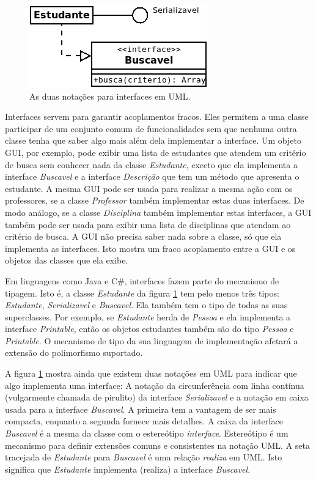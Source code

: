 \begin{figure}[h]
\begin{center}
\includegraphics[scale=0.7]{ifcUml.png}
\end{center}
\caption{As duas notações para interfaces em UML.} \label{fig:ifcUml}
\end{figure}

Interfaces servem para garantir acoplamentos fracos. Eles permitem a uma classe participar de um conjunto comum de funcionalidades sem que nenhuma outra classe tenha que saber algo mais além dela implementar a interface. Um objeto GUI, por exemplo, pode exibir uma lista de estudantes que atendem um critério de busca sem conhecer nada da classe \emph{Estudante}, exceto que ela implementa a interface \emph{Buscavel} e a interface \emph{Descrição} que tem um método que apresenta o estudante. A mesma GUI pode ser usada para realizar a mesma ação com os professores, se a classe \emph{Professor} também implementar estas duas interfaces. De modo análogo, se a classe \emph{Disciplina} também implementar estas interfaces, a GUI também pode ser usada para exibir uma lista de disciplinas que atendam ao critério de busca. A GUI não precisa saber nada sobre a classe, só que ela implementa as interfaces. Isto mostra um fraco acoplamento entre a GUI e os objetos das classes que ela exibe.

Em linguagens como Java e C\#, interfaces fazem parte do mecanismo de tipagem. Isto é, a classe \emph{Estudante} da figura \ref{fig:ifcUml} tem pelo menos três tipos: \emph{Estudante}, \emph{Serializavel} e \emph{Buscavel}. Ela também tem o tipo de todas as suas superclasses. Por exemplo, se \emph{Estudante} herda de \emph{Pessoa} e ela implementa a interface \emph{Printable}, então os objetos estudantes também são do tipo \emph{Pessoa} e \emph{Printable}. O mecanismo de tipo da sua linguagem de implementação afetará a extensão do polimorfismo suportado.

A figura \ref{fig:ifcUml} mostra ainda que existem duas notações em UML para indicar que algo implementa uma interface: A notação da circunferência com linha contínua (vulgarmente chamada de pirulito) da interface \emph{Serializavel} e a notação em caixa usada para a interface \emph{Buscavel}. A primeira tem a vantagem de ser mais compacta, enquanto a segunda fornece mais detalhes. A caixa da interface \emph{Buscavel} é a mesma da classe com o estereótipo \emph{interface}. Estereótipo é um mecanismo para definir extensões comuns e consistentes na notação UML. A seta tracejada de \emph{Estudante} para \emph{Buscavel} é uma relação \emph{realiza} em UML. Isto significa que \emph{Estudante} implementa (realiza) a interface \emph{Buscavel}.

